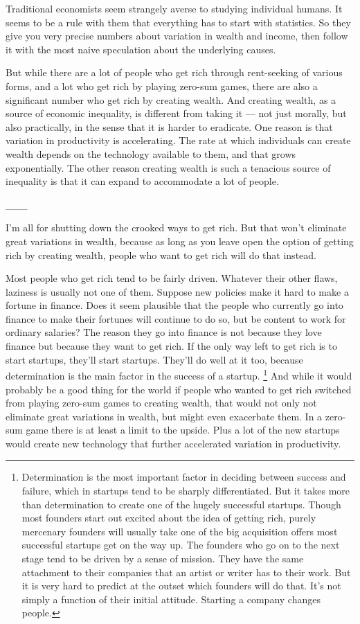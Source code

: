 \documentclass[12pt]{book}
\begin{document}
Traditional economists seem strangely averse to studying individual
humans. It seems to be a rule with them that everything has to start
with statistics. So they give you very precise numbers about variation
in wealth and income, then follow it with the most naive speculation
about the underlying causes.

But while there are a lot of people who get rich through rent-seeking of
various forms, and a lot who get rich by playing zero-sum games, there
are also a significant number who get rich by creating wealth. And
creating wealth, as a source of economic inequality, is different from
taking it --- not just morally, but also practically, in the sense that
it is harder to eradicate. One reason is that variation in productivity
is accelerating. The rate at which individuals can create wealth depends
on the technology available to them, and that grows exponentially. The
other reason creating wealth is such a tenacious source of inequality is
that it can expand to accommodate a lot of people.

\_\_\_

I'm all for shutting down the crooked ways to get rich. But that won't
eliminate great variations in wealth, because as long as you leave open
the option of getting rich by creating wealth, people who want to get
rich will do that instead.

Most people who get rich tend to be fairly driven. Whatever their other
flaws, laziness is usually not one of them. Suppose new policies make it
hard to make a fortune in finance. Does it seem plausible that the
people who currently go into finance to make their fortunes will
continue to do so, but be content to work for ordinary salaries? The
reason they go into finance is not because they love finance but because
they want to get rich. If the only way left to get rich is to start
startups, they'll start startups. They'll do well at it too, because
determination is the main factor in the success of a startup.
\footnote{Determination is the most important factor in deciding between
success and failure, which in startups tend to be sharply
differentiated. But it takes more than determination to create one of
the hugely successful startups. Though most founders start out excited
about the idea of getting rich, purely mercenary founders will usually
take one of the big acquisition offers most successful startups get on
the way up. The founders who go on to the next stage tend to be driven
by a sense of mission. They have the same attachment to their companies
that an artist or writer has to their work. But it is very hard to
predict at the outset which founders will do that. It's not simply a
function of their initial attitude. Starting a company changes people.} And while it would probably be a good thing for
the world if people who wanted to get rich switched from playing
zero-sum games to creating wealth, that would not only not eliminate
great variations in wealth, but might even exacerbate them. In a
zero-sum game there is at least a limit to the upside. Plus a lot of the
new startups would create new technology that further accelerated
variation in productivity.
\end{document}
